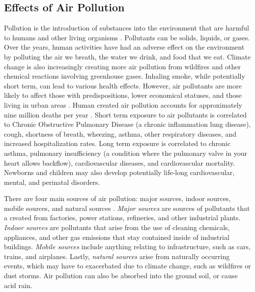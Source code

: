 \subsection{Effects of Air Pollution}
Pollution is the introduction of substances into the environment that are
harmful to humans and other living organisms
\cite{health-impacts-air-pollution-review}. Pollutants can be solids, liquids,
or gases. Over the years, human activities have had an adverse effect on
the environment by polluting the air we breath, the water we drink, and food that we eat. Climate change is also increasingly creating more air pollution from
wildfires and other chemical reactions involving greenhouse gases. Inhaling
smoke, while potentially short term, can lead to various
health effects. However, air pollutants are more likely to affect those with
predispositions, lower economical statuses, and those living in
urban areas \cite{socioeconomic-disparities-air-pollution-review}.  Human
created air pollution accounts for approximately nine million deaths per year
\cite{health-impacts-air-pollution-review}. Short term exposure to air
pollutants is correlated to Chronic Obstructive Pulmonary Disease (a chronic
inflammation lung disease), cough, shortness of breath, wheezing, asthma, other
respiratory diseases, and increased hospitalization rates. Long term exposure
is correlated to chronic asthma, pulmonary insufficiency (a condition where the
pulmonary valve in your heart allows backflow), cardiovascular diseases, and
cardiovascular mortality. Newborns and children may also develop potentially
life-long cardiovascular, mental, and perinatal disorders. 

There are four 
main sources of air pollution: major sources, indoor sources, mobile sources,
and natural sources \cite{health-impacts-air-pollution-review}. \emph{Major
sources} are sources of pollutants that a created from factories, power
stations, refineries, and other industrial plants. \emph{Indoor sources} are
pollutants that arise from the use of cleaning chemicals, appliances, and other
gas emissions that stay contained inside of industrial buildings. \emph{Mobile
sources} include anything relating to infrastructure, such as cars, trains, and
airplanes. Lastly, \emph{natural sources} arise from naturally occurring
events, which may have to exacerbated due to climate change, such as wildfires
or dust storms. Air pollution can also be absorbed into the ground soil, or
cause acid rain. 


